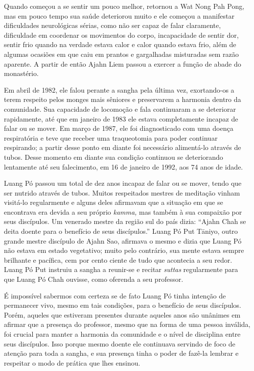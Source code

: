 Quando começou a se sentir um pouco melhor, retornou a Wat Nong Pah
Pong, mas em pouco tempo sua saúde deteriorou muito e ele começou a
manifestar dificuldades neurológicas sérias, como não ser capaz de falar
claramente, dificuldade em coordenar os movimentos do corpo,
incapacidade de sentir dor, sentir frio quando na verdade estava calor e
calor quando estava frio, além de algumas ocasiões em que caiu em
prantos e gargalhadas misturadas sem razão aparente. A partir de então
Ajahn Liem passou a exercer a função de abade do monastério.

Em abril de 1982, ele falou perante a sangha pela última vez,
exortando-os a terem respeito pelos monges mais sêniores e preservarem a
harmonia dentro da comunidade. Sua capacidade de locomoção e fala
continuaram a se deteriorar rapidamente, até que em janeiro de 1983 ele
estava completamente incapaz de falar ou se mover. Em março de 1987, ele
foi diagnosticado com uma doença respiratória e teve que receber uma
traqueotomia para poder continuar respirando; a partir desse ponto em
diante foi necessário alimentá-lo através de tubos. Desse momento em
diante sua condição continuou se deteriorando lentamente até seu
falecimento, em 16 de janeiro de 1992, aos 74 anos de idade.

Luang Pó passou um total de dez anos incapaz de falar ou se mover, tendo
que ser nutrido através de tubos. Muitos respeitados mestres de
meditação vinham visitá-lo regularmente e alguns deles afirmavam que a
situação em que se encontrava era devida a seu próprio \emph{kamma,} mas
também à sua compaixão por seus discípulos. Um venerado mestre da região
sul do país dizia: ``Ajahn Chah se deita doente para o benefício de seus
discípulos.'' Luang Pó Put Tāniyo, outro grande mestre discípulo de
Ajahn Sao, afirmava o mesmo e dizia que Luang Pó não estava em estado
vegetativo; muito pelo contrário, sua mente estava sempre brilhante e
pacífica, cem por cento ciente de tudo que acontecia a seu redor. Luang
Pó Put instruiu a sangha a reunir-se e recitar \emph{suttas}
regularmente para que Luang Pó Chah ouvisse, como oferenda a seu
professor.

É impossível sabermos com certeza se de fato Luang Pó tinha intenção de
permanecer vivo, mesmo em tais condições, para o benefício de seus
discípulos. Porém, aqueles que estiveram presentes durante aqueles anos
são unânimes em afirmar que a presença do professor, mesmo que na forma
de uma pessoa inválida, foi crucial para manter a harmonia da comunidade
e o nível de disciplina entre seus discípulos. Isso porque mesmo doente
ele continuava servindo de foco de atenção para toda a sangha, e sua
presença tinha o poder de fazê-la lembrar e respeitar o modo de prática
que lhes ensinou.

